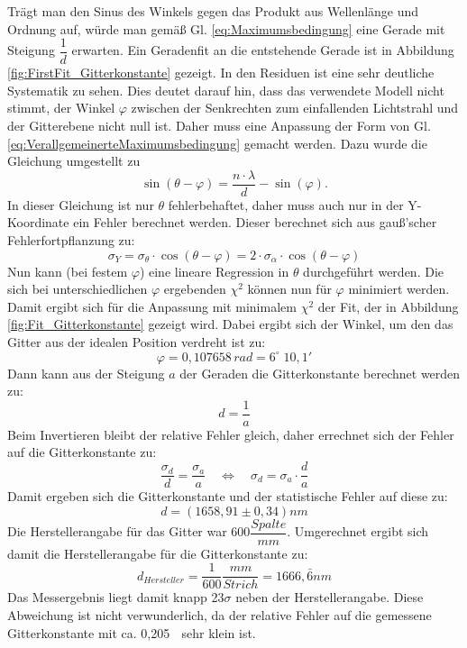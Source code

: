 \documentclass[12pt,a4paper]{article}
\begin{document}
	Trägt man den Sinus des Winkels gegen das Produkt aus Wellenlänge und Ordnung auf, würde man gemäß Gl. \ref{eq:Maximumsbedingung} eine Gerade mit Steigung $\dfrac{1}{d}$ erwarten. Ein Geradenfit an die entstehende Gerade ist in Abbildung \ref{fig:FirstFit_Gitterkonstante} gezeigt. In den Residuen ist eine sehr deutliche Systematik zu sehen. Dies deutet darauf hin, dass das verwendete Modell nicht stimmt, der Winkel $\varphi$ zwischen der Senkrechten zum einfallenden Lichtstrahl und der Gitterebene nicht null ist. Daher muss eine Anpassung der Form von Gl. \ref{eq:VerallgemeinerteMaximumsbedingung} gemacht werden. Dazu wurde die Gleichung umgestellt zu
	\begin{equation}
	\sin (\theta - \varphi) = \dfrac{n \cdot \lambda}{d} - \sin (\varphi).
	\end{equation}
	In dieser Gleichung ist nur $\theta$ fehlerbehaftet, daher muss auch nur in der Y-Koordinate ein Fehler berechnet werden. Dieser berechnet sich aus gauß'scher Fehlerfortpflanzung zu:
	\begin{equation}
	\sigma _Y = \sigma _{\theta} \cdot \cos(\theta - \varphi) = 2 \cdot \sigma _{\alpha} \cdot \cos(\theta - \varphi)
	\end{equation}
	Nun kann (bei festem $\varphi$) eine lineare Regression in $\theta$ durchgeführt werden. Die sich bei unterschiedlichen $\varphi$ ergebenden $\chi ^2$ können nun für $\varphi$ minimiert werden. Damit ergibt sich für die Anpassung mit minimalem $\chi ^2$ der Fit, der in Abbildung \ref{fig:Fit_Gitterkonstante} gezeigt wird. Dabei ergibt sich der Winkel, um den das Gitter aus der idealen Position verdreht ist zu:
	\begin{equation*}
	\varphi = 0,107658 \, rad = 6 ^{\circ} \; 10,1'
	\end{equation*}
	Dann kann aus der Steigung $a$ der Geraden die Gitterkonstante berechnet werden zu:
	\begin{equation}
	d = \dfrac{1}{a}
	\end{equation}
	Beim Invertieren bleibt der relative Fehler gleich, daher errechnet sich der Fehler auf die Gitterkonstante zu:
	\begin{equation}
	\dfrac{\sigma_d}{d} = \dfrac{\sigma_a}{a} \quad \Leftrightarrow \quad \sigma_d = \sigma_a \cdot \dfrac{d}{a}
	\end{equation}
	Damit ergeben sich die Gitterkonstante und der statistische Fehler auf diese zu:
	\begin{equation*}
	d = (1658,91 \pm 0,34)nm
	\end{equation*}
Die Herstellerangabe für das Gitter war $600 \dfrac{Spalte}{mm}$. Umgerechnet ergibt sich damit die Herstellerangabe für die Gitterkonstante zu:
\begin{equation*}
d_{Hersteller} = \dfrac{1}{600} \dfrac{mm}{Strich} = 1666,\bar{6} nm
\end{equation*}
Das Messergebnis liegt damit knapp 23$\sigma$ neben der Herstellerangabe. Diese Abweichung ist nicht verwunderlich, da der relative Fehler auf die gemessene Gitterkonstante mit ca. 0,205 \textperthousand $\;$ sehr klein ist.
	
\end{document}
